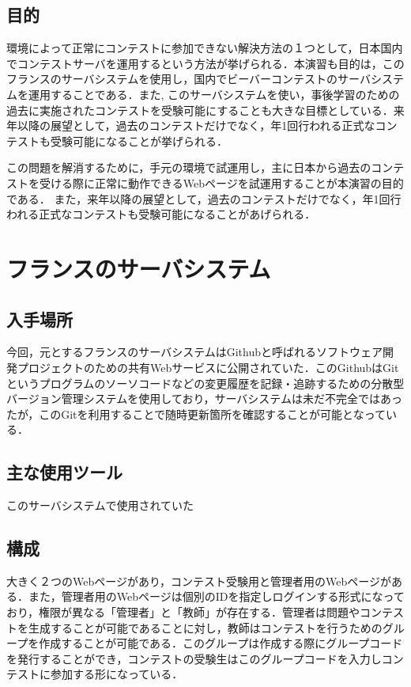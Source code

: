 \documentclass[a4paper]{jarticle}
\begin{document}
\begin{multicols}{2}
\subsection{目的}
環境によって正常にコンテストに参加できない解決方法の１つとして，日本国内でコンテストサーバを運用するという方法が挙げられる．本演習も目的は，このフランスのサーバシステムを使用し，国内でビーバーコンテストのサーバシステムを運用することである．また, このサーバシステムを使い，事後学習のための過去に実施されたコンテストを受験可能にすることも大きな目標としている．来年以降の展望として，過去のコンテストだけでなく，年1回行われる正式なコンテストも受験可能になることが挙げられる．

この問題を解消するために，手元の環境で試運用し，主に日本から過去のコンテストを受ける際に正常に動作できるWebページを試運用することが本演習の目的である．
また，来年以降の展望として，過去のコンテストだけでなく，年1回行われる正式なコンテストも受験可能になることがあげられる．
\fi	%

\section{フランスのサーバシステム}
\subsection{入手場所}
今回，元とするフランスのサーバシステムはGithubと呼ばれるソフトウェア開発プロジェクトのための共有Webサービスに公開されていた．このGithubはGitというプログラムのソーソコードなどの変更履歴を記録・追跡するための分散型バージョン管理システムを使用しており，サーバシステムは未だ不完全ではあったが，このGitを利用することで随時更新箇所を確認することが可能となっている．

\subsection{主な使用ツール}
このサーバシステムで使用されていた

\subsection{構成}
大きく２つのWebページがあり，コンテスト受験用と管理者用のWebページがある．また，管理者用のWebページは個別のIDを指定しログインする形式になっており，権限が異なる「管理者」と「教師」が存在する．管理者は問題やコンテストを生成することが可能であることに対し，教師はコンテストを行うためのグループを作成することが可能である．このグループは作成する際にグループコードを発行することができ，コンテストの受験生はこのグループコードを入力しコンテストに参加する形になっている．



\end{multicols}
\end{document}
